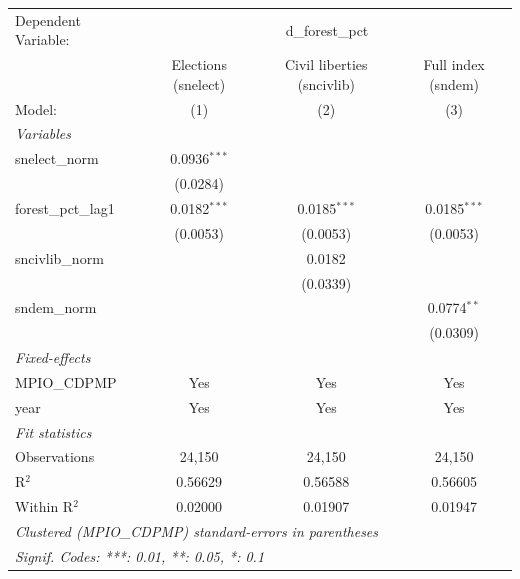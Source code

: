 
\begingroup
\centering
\begin{tabular}{lccc}
   \tabularnewline \midrule \midrule
   Dependent Variable: & \multicolumn{3}{c}{d\_forest\_pct}\\
                       & Elections (snelect) & Civil liberties (sncivlib) & Full index (sndem) \\   
   Model:              & (1)                 & (2)                        & (3)\\  
   \midrule
   \emph{Variables}\\
   snelect\_norm       & 0.0936$^{***}$      &                            &   \\   
                       & (0.0284)            &                            &   \\   
   forest\_pct\_lag1   & 0.0182$^{***}$      & 0.0185$^{***}$             & 0.0185$^{***}$\\   
                       & (0.0053)            & (0.0053)                   & (0.0053)\\   
   sncivlib\_norm      &                     & 0.0182                     &   \\   
                       &                     & (0.0339)                   &   \\   
   sndem\_norm         &                     &                            & 0.0774$^{**}$\\   
                       &                     &                            & (0.0309)\\   
   \midrule
   \emph{Fixed-effects}\\
   MPIO\_CDPMP         & Yes                 & Yes                        & Yes\\  
   year                & Yes                 & Yes                        & Yes\\  
   \midrule
   \emph{Fit statistics}\\
   Observations        & 24,150              & 24,150                     & 24,150\\  
   R$^2$               & 0.56629             & 0.56588                    & 0.56605\\  
   Within R$^2$        & 0.02000             & 0.01907                    & 0.01947\\  
   \midrule \midrule
   \multicolumn{4}{l}{\emph{Clustered (MPIO\_CDPMP) standard-errors in parentheses}}\\
   \multicolumn{4}{l}{\emph{Signif. Codes: ***: 0.01, **: 0.05, *: 0.1}}\\
\end{tabular}
\par\endgroup


